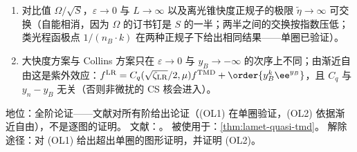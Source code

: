 \begin{assumption}\label{asm:lamet-order-limits}
\begin{enumerate}[label=(OL\arabic*),leftmargin=3.2em,itemsep=1pt,topsep=2pt]
\item 对比值 $\Omega/\sqrt S$，$\varepsilon\to0$ 与 $L\to\infty$ 以及离光锥快度正规子的极限 $\tilde\eta\to\infty$ 可交换（自能相消，因为 $\Omega$ 的订书钉是 $S$ 的一半；两半之间的交换按指数压低；类光程函极点 $1/(n_B\cdot k)$ 在两种正规子下给出相同结果——单圈已验证）。
\item 大快度方案与 Collins 方案只在 $\varepsilon\to0$ 与 $y_B\to-\infty$ 的次序上不同；由渐近自由这是紫外效应：$f^{\rm LR}=C_q(\sqrt{\zeta_{\rm LR}}/2,\mu)f^{\rm TMD}+\order{y_B^k\ee^{y_B}}$，且 $C_q$ 与 $y_n-y_B$ 无关（否则非微扰的 CS 核会进入）。
\end{enumerate}
地位：全阶论证——文献\cite{Ebert:2022fmh}对所有阶给出论证（(OL1) 在单圈验证，(OL2) 依据渐近自由），不是逐图的证明。
文献：\cite{Ebert:2022fmh}。
被使用于：\cref{thm:lamet-quasi-tmd}。
解除途径：对 (OL1) 给出超出单圈的图形证明，并证明 (OL2)。
\end{assumption}

